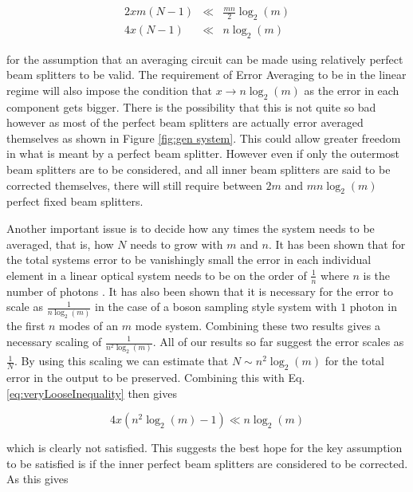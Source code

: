 \documentclass[aps,pra,twocolumn,superscriptaddress,numerical]{revtex4-1}
\begin{document}
		\begin{eqnarray}
			2xm\left(N-1\right) & \ll & \frac{mn}{2}\log_{2}\left(m\right)\nonumber \\
			4x\left(N-1\right) & \ll & n\log_{2}\left(m\right)\label{eq:veryLooseInequality}
		\end{eqnarray}
		
		
		for the assumption that an averaging circuit can be made using relatively perfect beam splitters to be valid. The requirement of Error Averaging to be in the linear regime will also impose the condition that $x\rightarrow n\log_{2}\left(m\right)$ as the error in each component gets bigger. There is the possibility that this is not quite so bad however as most of the perfect beam splitters are actually error averaged themselves as shown in Figure \ref{fig:gen system}. This could allow greater freedom in what is meant by a perfect beam splitter. However even if only	the outermost beam splitters are to be considered, and all inner beam splitters are said to be corrected themselves, there will still require between $2m$ and $mn\log_{2}\left(m\right)$ perfect fixed beam splitters.
		
		Another important issue is to decide how any times the system needs	to be averaged, that is, how $N$ needs to grow with $m$ and $n$. It has been shown that for the total systems error to be vanishingly small the error in each individual element in a linear optical system	needs to be on the order of $\frac{1}{n}$ where $n$ is the number of photons \cite{arkhipov2014}. It has also been shown that it is	necessary for the error to scale as $\frac{1}{n\log_{2}\left(m\right)}$	\cite{Boson} in the case of a boson sampling style system with $1$ photon in the first $n$ modes of an $m$ mode system. Combining these	two results gives a necessary scaling of $\frac{1}{n^{2}\log_{2}\left(m\right)}$. All of our results so far suggest the error scales as $\frac{1}{N}$. By using this scaling we can estimate that $N\sim n^{2}\log_{2}\left(m\right)$ for the total error in the output to be preserved. Combining this with Eq. \ref{eq:veryLooseInequality} then gives 
		
		\begin{equation}
			4x\left(n^{2}\log_{2}\left(m\right)-1\right)\ll n\log_{2}\left(m\right)\label{eq:LooseInequality}
		\end{equation}
		
		
		which is clearly not satisfied. This suggests the best hope for the key assumption to be satisfied is if the inner perfect beam splitters are considered to be corrected. As this gives
			
\end{document}
